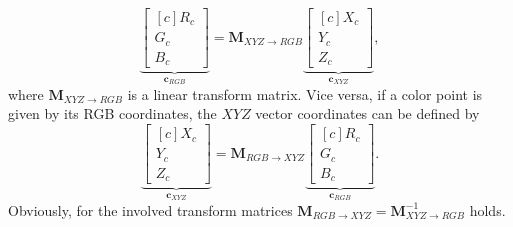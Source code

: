\begin{equation} 
\underbrace{\begin{bmatrix}[c]
       R_c \\[0.3em]
       G_c \\[0.3em]
       B_c \end{bmatrix}}_{\mathbf{c}_{RGB}}
       =
     \mathbf{M}_{X\!Y\!Z \rightarrow R\!G\!B}
      \underbrace{\begin{bmatrix}[c]
       X_c \\[0.3em]
       Y_c \\[0.3em]
       Z_c \end{bmatrix}}_{\mathbf{c}_{X\!Y\!Z}},
\end{equation}
where $ \mathbf{M}_{X\!Y\!Z \rightarrow R\!G\!B}$ is a linear transform matrix. 
Vice versa, if a color point is given by its RGB coordinates, the $XYZ$ vector coordinates can be defined by
\begin{equation}
      \underbrace{\begin{bmatrix}[c]
       X_c \\[0.3em]
       Y_c \\[0.3em]
       Z_c \end{bmatrix}}_{\mathbf{c}_{X\!Y\!Z}} = 
     \mathbf{M}_{R\!G\!B \rightarrow X\!Y\!Z}
\underbrace{\begin{bmatrix}[c]
       R_c \\[0.3em]
       G_c \\[0.3em]
       B_c \end{bmatrix}}_{\mathbf{c}_{RGB}}.
\end{equation}
Obviously, for the involved transform matrices $\mathbf{M}_{R\!G\!B \rightarrow X\!Y\!Z} = \mathbf{M}_{X\!Y\!Z \rightarrow R\!G\!B}^{-1}$ holds.

